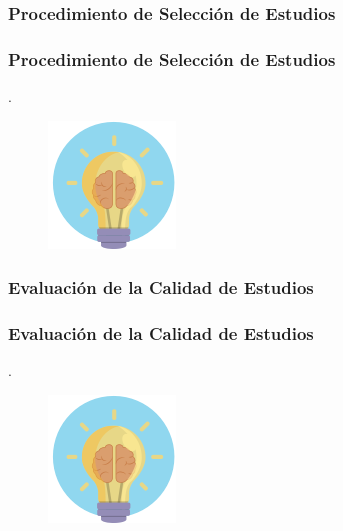 \documentclass{beamer}
\begin{document}
\subsubsection{Procedimiento de Selección de Estudios} %
\begin{frame}
    \frametitle{Procedimiento de Selección de Estudios}
    .
	\begin{figure}
		\begin{center}
			\includegraphics[scale=0.45]{images/2icons/need.png}
			\label{student}
		\end{center}
	\end{figure}
\end{frame}
\subsubsection{Evaluación de la Calidad de Estudios} %
\begin{frame}
    \frametitle{Evaluación de la Calidad de Estudios}
    .
	\begin{figure}
		\begin{center}
			\includegraphics[scale=0.45]{images/2icons/need.png}
			\label{student}
		\end{center}
	\end{figure}
\end{frame}
\end{document}

